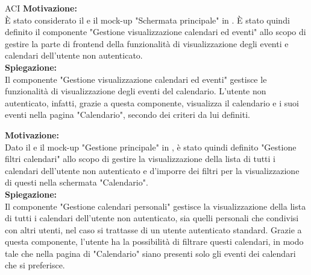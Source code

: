 \begin{listaPersonale}{ACI}
    \textbf{Motivazione:}\\
    È stato considerato il  e il mock-up  "Schermata principale" in .
    È stato quindi definito il componente "Gestione visualizzazione calendari ed eventi" allo scopo di gestire la parte di frontend della funzionalità di visualizzazione degli eventi e calendari dell'utente non autenticato.\\
    \textbf{Spiegazione:}\\
    Il componente "Gestione visualizzazione calendari ed eventi" gestisce le funzionalità di visualizzazione degli eventi del calendario. L'utente non autenticato, infatti, grazie a questa componente, visualizza il calendario e i suoi eventi nella pagina "Calendario", secondo dei criteri da lui definiti.


    \textbf{Motivazione:}\\
    Dato il  e il mock-up "Gestione principale" in , è stato quindi definito "Gestione filtri calendari" allo scopo di gestire la visualizzazione della lista di tutti i calendari dell'utente non autenticato e d'imporre dei filtri per la visualizzazione di questi nella schermata "Calendario".\\
    \textbf{Spiegazione:}\\
    Il componente "Gestione calendari personali" gestisce la visualizzazione della lista di tutti i calendari dell'utente non autenticato, sia quelli personali che condivisi con altri utenti, nel caso si trattasse di un utente autenticato standard. Grazie a questa componente, l'utente ha la possibilità di filtrare questi calendari, in modo tale che nella pagina di "Calendario" siano presenti solo gli eventi dei calendari che si preferisce.



\end{listaPersonale}
